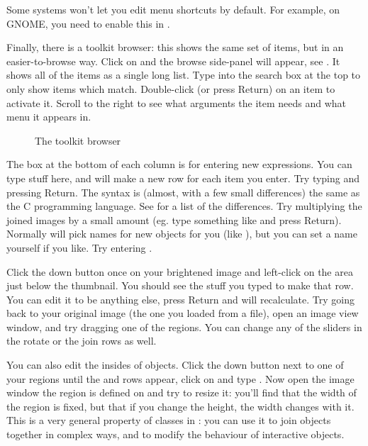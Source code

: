 Some systems won't let you edit menu shortcuts by default. For example,
on GNOME, you need to enable this in .

Finally, there is a toolkit browser: this shows the same set of items, but in
an easier-to-browse way. Click on  and the
browse side-panel will appear, see . It shows all of the items
as a single long list. Type into the search box at the top to only show items
which match. Double-click (or press Return) on an item to activate it. Scroll
to the right to see what arguments the item needs and what menu it appears in.

\begin{figure}
\caption{The toolkit browser}
\end{figure}

The box at the bottom of each column is for entering new expressions. You
can type stuff here, and \nip{} will make a new row for each item you
enter. Try typing  and pressing Return. The syntax is (almost,
with a few small differences) the same as the C programming language. See
 for a list of the differences. Try
multiplying the joined images by a small amount (eg. type something like
 and press Return). Normally \nip{} will pick names for new
objects for you (like ), but you can set a name yourself if you like.
Try entering .

Click the down button once on your brightened image and left-click on the area
just below the thumbnail. You should see the stuff you typed to make that row.
You can edit it to be anything else, press Return and \nip{} will recalculate.
Try going back to your original image (the one you loaded from a file),
open an image view window, and try dragging one of the regions. You can
change any of the sliders in the rotate or the join rows as well.  

You can also edit the insides of objects. Click the down button next to
one of your regions until the  and  rows appear, click on
 and type . Now open the image window the region is
defined on and try to resize it: you'll find that the width of the region is
fixed, but that if you change the height, the width changes with it. This is a
very general property of classes in \nip{}: you can use it to join objects
together in complex ways, and to modify the behaviour of interactive objects. 

